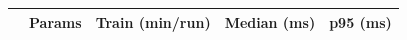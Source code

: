 \begin{tabular}{@{}lcccc@{}}
\toprule
 & Params & Train (min/run) & Median (ms) & p95 (ms) \\
\midrule
\bottomrule
\end{tabular}
